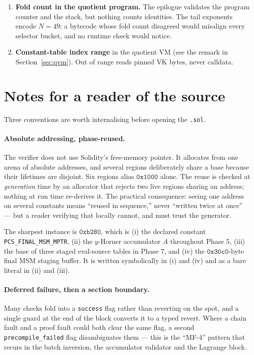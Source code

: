 \documentclass[11pt,a4paper]{article}
\newcommand{\code}[1]{\texttt{#1}}
\newcommand{\mptr}[1]{\texttt{#1}}
\theoremstyle{definition}
\begin{document}
\begin{enumerate}[label=\textbf{N\arabic*.},leftmargin=1.4cm]
\item \textbf{Fold count in the quotient program.} The epilogue validates the
program counter and the stack, but nothing counts identities. The tail
exponents encode $N=49$; a bytecode whose fold count disagreed would misalign
every selector bucket, and no runtime check would notice.

\item \textbf{Constant-table index range} in the quotient VM (see the remark in
Section~\ref{sec:qvm}). Out of range reads pinned VK bytes, never calldata.

\end{enumerate}

\section{Notes for a reader of the source}
\label{sec:reading}

Three conventions are worth internalising before opening the \code{.sol}.

\paragraph{Absolute addressing, phase-reused.}
The verifier does not use Solidity's free-memory pointer. It allocates from one
arena of absolute addresses, and several regions deliberately share a base
because their lifetimes are disjoint. Six regions alias $\mathtt{0x1000}$
alone. The reuse is checked at \emph{generation} time by an allocator that
rejects two live regions sharing an address; nothing at run time re-derives it.
The practical consequence: seeing one address on several constants means
``reused in sequence,'' never ``written twice at once'' --- but a reader
verifying that locally cannot, and must trust the generator.

The sharpest instance is $\mathtt{0xb280}$, which is
(i) the declared constant \mptr{PCS\_FINAL\_MSM\_MPTR},
(ii) the $y$-Horner accumulator $A$ throughout Phase 5,
(iii) the base of three staged eval-source tables in Phase 7, and
(iv) the $\mathtt{0x30c0}$-byte final MSM staging buffer.
It is written symbolically in (i) and (iv) and as a bare literal in (ii) and
(iii).

\paragraph{Deferred failure, then a section boundary.}
Many checks fold into a \code{success} flag rather than reverting on the spot,
and a single guard at the end of the block converts it to a typed revert. Where
a chain fault and a proof fault could both clear the same flag, a second
\code{precompile\_failed} flag disambiguates them --- this is the ``MF-4''
pattern that recurs in the batch inversion, the accumulator validator and the
Lagrange block.
\end{document}
